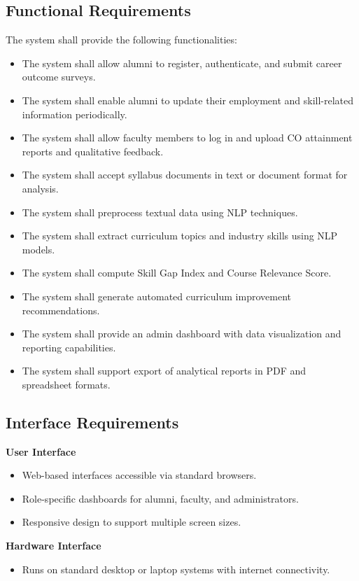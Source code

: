 \subsection{Functional Requirements}
The system shall provide the following functionalities:
\begin{itemize}
    \item The system shall allow alumni to register, authenticate, and submit career outcome surveys.
    \item The system shall enable alumni to update their employment and skill-related information periodically.
    \item The system shall allow faculty members to log in and upload CO attainment reports and qualitative feedback.
    \item The system shall accept syllabus documents in text or document format for analysis.
    \item The system shall preprocess textual data using NLP techniques.
    \item The system shall extract curriculum topics and industry skills using NLP models.
    \item The system shall compute Skill Gap Index and Course Relevance Score.
    \item The system shall generate automated curriculum improvement recommendations.
    \item The system shall provide an admin dashboard with data visualization and reporting capabilities.
    \item The system shall support export of analytical reports in PDF and spreadsheet formats.
\end{itemize}

\subsection{Interface Requirements}
\textbf{User Interface}
\begin{itemize}
    \item Web-based interfaces accessible via standard browsers.
    \item Role-specific dashboards for alumni, faculty, and administrators.
    \item Responsive design to support multiple screen sizes.
\end{itemize}

\textbf{Hardware Interface}
\begin{itemize}
    \item Runs on standard desktop or laptop systems with internet connectivity.
\end{itemize}

